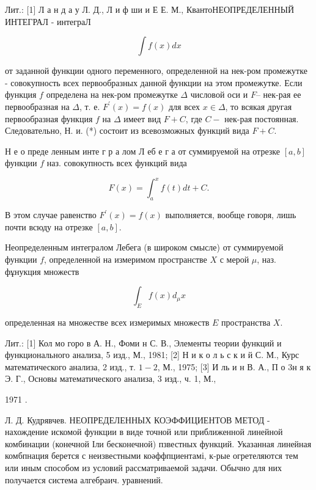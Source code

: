 \documentclass[10pt]{article}
\begin{document}
Лит.: [1] Л а н д а у Л. Д., Л и ф ши и Е Е. М., КвантоНЕОПРЕДЕЛЕННЫЙ ИНТЕГРАЛ - интеграЛ



\[

\int f(x) d x

\]



от заданной функции одного переменного, определенной на нек-ром промежутке - совокупность всех первообразных данной функции на этом промежутке. Если функция $f$ определена на нек-ром промежутке $\Delta$ числовой оси и $F$-- нек-рая ее первообразная на $\Delta$, т. е. $F^{\prime}(x)=f(x)$ для всех $x \in \Delta$, то всякая другая первообразная функция $f$ на $\Delta$ имеет вид $F+C$, где $C-$ нек-рая постоянная. Следовательно, Н. и. (*) состоит из всевозможных функций вида $F+C$.



Н е о преде ленным инте г р а лом Л еб е г а от суммируемой на отрезке $[a, b]$ функции $f$ наз. совокупность всех функций вида



\[

F(x)=\int_{a}^{x} f(t) d t+C .

\]



В этом случае равенство $F^{\prime}(x)=f(x)$ выполняется, вообще говоря, лишь почти всюду на отрезке $[a, b]$.



Неопределенным интегралом Лебега (в широком смысле) от суммируемой функции $f$, определенной на измеримом пространстве $X$ с мерой $\mu$, наз. фұнукция множеств



\[

\int_{E} f(x) d_{\mu} x

\]



определенная на множестве всех измеримых множеств $E$ пространства $X$.



Лит.: [1] Кол мо горо в А. Н., Фоми н С. В., Элементы теории функций и функционального анализа, 5 изд., М., 1981; [2] Н и к о л ь с к и й С. М., Курс математического анализа, 2 изд., т. $1-2$, М., 1975; [3] И ль и н В. А., П о 3н я к Э. Г., Основы математического анализа, 3 изд., ч. 1, М.,

1971 .

Л. Д. Кудрявчев. НЕОПРЕДЕЛЕННЫХ КОЭФФИЦИЕНТОВ МЕТОД - нахождение искомой функции в виде точной или приближенной линейной комбинации (конечной Іли бесконечной) пзвестных функций. Указанная линейная комбпнация берется с неизвестными коәффпциентамі, к-рые огретеляются тем или иным способом из условий рассматриваемой задачи. Обычно для них получается система алгебраич. уравнений.
\end{document}
